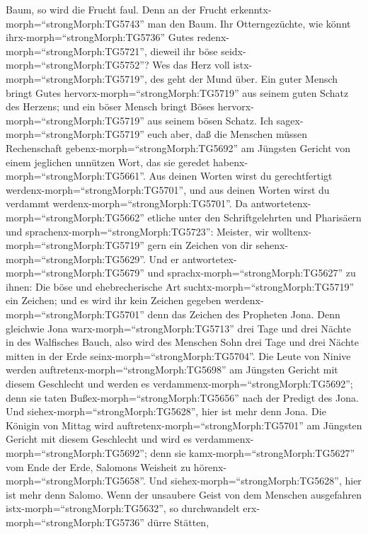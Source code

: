 Baum, so wird die Frucht faul. Denn an der Frucht
erkenntx-morph=``strongMorph:TG5743'' man den Baum.  Ihr
Otterngezüchte, wie könnt ihrx-morph=``strongMorph:TG5736'' Gutes
redenx-morph=``strongMorph:TG5721'', dieweil ihr böse
seidx-morph=``strongMorph:TG5752''? Wes das Herz voll
istx-morph=``strongMorph:TG5719'', des geht der Mund über. 
Ein guter Mensch bringt Gutes hervorx-morph=``strongMorph:TG5719'' aus
seinem guten Schatz des Herzens; und ein böser Mensch bringt Böses
hervorx-morph=``strongMorph:TG5719'' aus seinem bösen Schatz.
 Ich sagex-morph=``strongMorph:TG5719'' euch aber, daß die
Menschen müssen Rechenschaft gebenx-morph=``strongMorph:TG5692'' am
Jüngsten Gericht von einem jeglichen unnützen Wort, das sie geredet
habenx-morph=``strongMorph:TG5661''.  Aus deinen Worten
wirst du gerechtfertigt werdenx-morph=``strongMorph:TG5701'', und aus
deinen Worten wirst du verdammt werdenx-morph=``strongMorph:TG5701''.
 Da antwortetenx-morph=``strongMorph:TG5662'' etliche unter
den Schriftgelehrten und Pharisäern und
sprachenx-morph=``strongMorph:TG5723'': Meister, wir
wolltenx-morph=``strongMorph:TG5719'' gern ein Zeichen von dir
sehenx-morph=``strongMorph:TG5629''.  Und er
antwortetex-morph=``strongMorph:TG5679'' und
sprachx-morph=``strongMorph:TG5627'' zu ihnen: Die böse und
ehebrecherische Art suchtx-morph=``strongMorph:TG5719'' ein Zeichen; und
es wird ihr kein Zeichen gegeben werdenx-morph=``strongMorph:TG5701''
denn das Zeichen des Propheten Jona.  Denn gleichwie Jona
warx-morph=``strongMorph:TG5713'' drei Tage und drei Nächte in des
Walfisches Bauch, also wird des Menschen Sohn drei Tage und drei Nächte
mitten in der Erde seinx-morph=``strongMorph:TG5704''.  Die
Leute von Ninive werden auftretenx-morph=``strongMorph:TG5698'' am
Jüngsten Gericht mit diesem Geschlecht und werden es
verdammenx-morph=``strongMorph:TG5692''; denn sie taten
Bußex-morph=``strongMorph:TG5656'' nach der Predigt des Jona. Und
siehex-morph=``strongMorph:TG5628'', hier ist mehr denn Jona.
 Die Königin von Mittag wird
auftretenx-morph=``strongMorph:TG5701'' am Jüngsten Gericht mit diesem
Geschlecht und wird es verdammenx-morph=``strongMorph:TG5692''; denn sie
kamx-morph=``strongMorph:TG5627'' vom Ende der Erde, Salomons Weisheit
zu hörenx-morph=``strongMorph:TG5658''. Und
siehex-morph=``strongMorph:TG5628'', hier ist mehr denn Salomo.
 Wenn der unsaubere Geist von dem Menschen ausgefahren
istx-morph=``strongMorph:TG5632'', so durchwandelt
erx-morph=``strongMorph:TG5736'' dürre Stätten,
